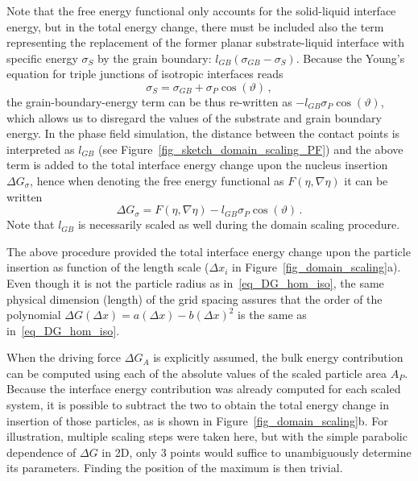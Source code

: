 Note that the free energy functional only accounts for the solid-liquid interface energy, but in the total energy change, there must be included also the term representing the replacement of the former planar substrate-liquid interface with specific energy $\sigma_S$ by the grain boundary: $l_{GB}(\sigma_{GB}-\sigma_S)$. Because the Young's equation for triple junctions of isotropic interfaces reads
\begin{equation}\label{eq_young_iso}
	\sigma_S = \sigma_{GB}+\sigma_P\cos(\vartheta) \,,
\end{equation}
the grain-boundary-energy term can be thus re-written as $-l_{GB}\sigma_P\cos(\vartheta)$, which allows us to disregard the values of the substrate and grain boundary energy. In the phase field simulation, the distance between the contact points is interpreted as $l_{GB}$ (see Figure~\ref{fig_sketch_domain_scaling_PF}) and the above term is added to the total interface energy change upon the nucleus insertion $\Delta G_\sigma$, hence when denoting the free energy functional as $F(\eta,\nabla\eta)$ it can be written
\begin{equation}
	\Delta G_\sigma = F(\eta,\nabla\eta) - l_{GB}\sigma_P\cos(\vartheta) \,.
\end{equation}
Note that $l_{GB}$ is necessarily scaled as well during the domain scaling procedure.

The above procedure provided the total interface energy change upon the particle insertion as function of the length scale ($\Delta x_i$ in Figure~\ref{fig_domain_scaling}a). Even though it is not the particle radius as in~\eqref{eq_DG_hom_iso}, the same physical dimension (length) of the grid spacing assures that the order of the polynomial $\Delta G(\Delta x) = a(\Delta x) - b(\Delta x)^2$ is the same as in~\eqref{eq_DG_hom_iso}.

When the driving force $\Delta G_A$ is explicitly assumed, the bulk energy contribution can be computed using each of the absolute values of the scaled particle area $A_P$. Because the interface energy contribution was already computed for each scaled system, it is possible to subtract the two to obtain the total energy change in insertion of those particles, as is shown in Figure~\ref{fig_domain_scaling}b. For illustration, multiple scaling steps were taken here, but with the simple parabolic dependence of $\Delta G$ in 2D, only 3 points would suffice to unambiguously determine its parameters. Finding the position of the maximum is then trivial. 

